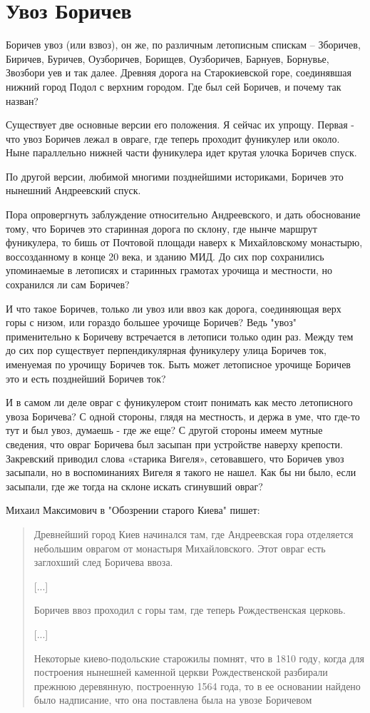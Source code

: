 \chapter {Увоз Боричев}

Боричев увоз (или взвоз), он же, по различным летописным спискам – Зборичев, Биричев, Буричев, Оузборичев, Борищев, Оузборичев, Барнуев, Борнувье, Звозбори уев и так далее. Древняя дорога на Старокиевской горе, соединявшая нижний город Подол с верхним городом. Где был сей Боричев, и почему так назван?

Существует две основные версии его положения. Я сейчас их упрощу. Первая - что увоз Боричев лежал в овраге, где теперь проходит фуникулер или около. Ныне параллельно нижней части фуникулера идет крутая улочка Боричев спуск. 

По другой версии, любимой многими позднейшими историками, Боричев это нынешний Андреевский спуск.

Пора опровергнуть заблуждение относительно Андреевского, и дать обоснование тому, что Боричев это старинная дорога по склону, где нынче маршрут фуникулера, то бишь от Почтовой площади наверх к Михайловскому монастырю, воссозданному в конце 20 века, и зданию МИД. До сих пор сохранились упоминаемые в летописях и старинных грамотах урочища и местности, но сохранился ли сам Боричев?

И что такое Боричев, только ли увоз или ввоз как дорога, соединяющая верх горы с низом, или гораздо большее урочище Боричев? Ведь "увоз" применительно к Боричеву встречается в летописи только один раз. Между тем до сих пор существует перпендикулярная фуникулеру улица Боричев ток, именуемая по урочищу Боричев ток. Быть может летописное урочище Боричев это и есть позднейший Боричев ток?

И в самом ли деле овраг с фуникулером стоит понимать как место летописного увоза Боричева? С одной стороны, глядя на местность, и держа в уме, что где-то тут и был увоз, думаешь - где же еще? С другой стороны имеем мутные сведения, что овраг Боричева был засыпан при устройстве наверху крепости. Закревский приводил слова «старика Вигеля», сетовавшего, что Боричев увоз засыпали, но в воспоминаниях Вигеля я такого не нашел. Как бы ни было, если засыпали, где же тогда на склоне искать сгинувший овраг?

Михаил Максимович в "Обозрении старого Киева"\cite{max} пишет:

\begin{quotation}
Древнейший город Киев начинался там, где Андреевская гора отделяется небольшим оврагом от монастыря Михайловского. Этот овраг есть заглохший след Боричева ввоза. 

[...]

Боричев ввоз проходил с горы там, где теперь Рождественская церковь.

[...]

Некоторые киево-подольские старожилы помнят, что в 1810 году, когда для построения нынешней каменной церкви Рождественской разбирали прежнюю деревянную, построенную 1564 года, то в ее основании найдено было надписание, что она поставлена была на увозе Боричевом
\end{quotation}

